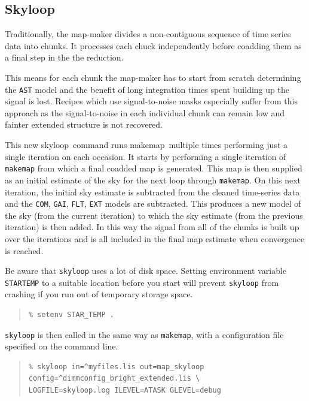 \documentclass[twoside,11pt]{article}
\newcommand{\xref}[3]{#1}
\newcommand{\xlabel}[1]{}
\renewcommand{\_}{\texttt{\symbol{95}}}
\newenvironment{myquote}{\begin{quote}\begin{small}}{\end{small}\end{quote}}
\newcommand{\task}[1]{\textsf{#1}}
\newcommand{\makemap}{\xref{\task{makemap}}{sun258}{MAKEMAP}}
\newcommand{\skyloop}{\xref{\task{skyloop}}{sun258}{SKYLOOP}}
\begin{document}
\subsection{\xlabel{skyloop}Skyloop}
\label{sec:skyloop}

Traditionally, the map-maker divides a non-contiguous sequence of time
series data into chunks. It processes each chuck independently
before coadding them as a final step in the the reduction.

This means for each chunk the map-maker has to start from scratch
determining the \texttt{AST} model and the benefit of long integration
times spent building up the signal is lost. Recipes which use
signal-to-noise masks especially suffer from this approach as the
signal-to-noise in each individual chunk can remain low and fainter
extended structure is not recovered.

This new \skyloop\ command runs \makemap\ multiple times
performing just a single iteration on each occasion. It starts by
performing a single iteration of \texttt{makemap} from which a final
coadded map is generated. This map is then supplied as an initial
estimate of the sky for the next loop through \texttt{makemap}. On
this next iteration, the initial sky estimate is subtracted from the
cleaned time-series data and the \texttt{COM}, \texttt{GAI},
\texttt{FLT}, \texttt{EXT} models are subtracted. This produces a new
model of the sky (from the current iteration) to which the sky
estimate (from the previous iteration) is then added. In this way the
signal from all of the chunks is built up over the iterations and is
all included in the final map estimate when convergence is reached.

Be aware that \texttt{skyloop} uses a lot of disk space. Setting
environment variable \texttt{STAR\_TEMP} to a suitable location
before you start will prevent \texttt{skyloop} from crashing
if you run out of temporary storage space.
\begin{myquote}
\begin{verbatim}
% setenv STAR_TEMP .
\end{verbatim}
\end{myquote}
 \texttt{skyloop} is then called in the same way as \texttt{makemap}, with
 a configuration file specified on the command line.
\begin{myquote}
\begin{verbatim}
% skyloop in=^myfiles.lis out=map_skyloop config=^dimmconfig_bright_extended.lis \
LOGFILE=skyloop.log ILEVEL=ATASK GLEVEL=debug
\end{verbatim}
\end{myquote}
\end{document}
